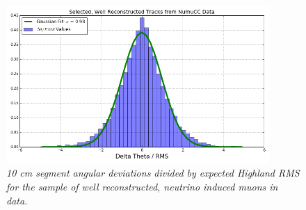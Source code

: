 \begin{figure}[ht!]
\begin{center}
\includegraphics[width=100mm]{Figures/Highland_validation_DataBNBSelectedRecoTrack.png}
\end{center}
\caption{\textit{10 cm segment angular deviations divided by expected Highland RMS for the sample of well reconstructed, neutrino induced muons in {\ub} data.}}
\label{Highland_validation_DataRecoTracks_fig}
\end{figure}











